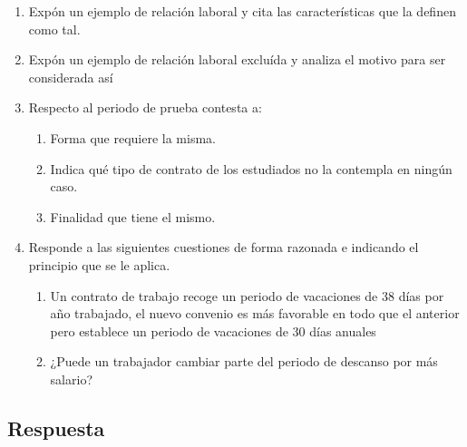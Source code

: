 \begin{enumerate}[label=\alph*]
    \item Expón un ejemplo de relación laboral y cita las características que la definen como tal.
    \item Expón un ejemplo de relación laboral excluída y analiza el motivo para ser considerada así
    \item Respecto al periodo de prueba contesta a:
    \begin{enumerate}[label=\arabic*]
        \item Forma que requiere la misma.
        \item Indica qué tipo de contrato de los estudiados no la contempla en ningún caso.
        \item Finalidad que tiene el mismo.
    \end{enumerate}
    \item Responde a las siguientes cuestiones de forma razonada e indicando el principio que se le aplica.
        \begin{enumerate}[label=\arabic*]
        \item Un contrato de trabajo recoge un periodo de vacaciones de 38 días por año trabajado, el nuevo convenio es más favorable en todo que el anterior pero establece un periodo de vacaciones de 30 días anuales
        \item ¿Puede un trabajador cambiar parte del periodo de descanso por más salario?
    \end{enumerate}
\end{enumerate}

\subsection{Respuesta}


